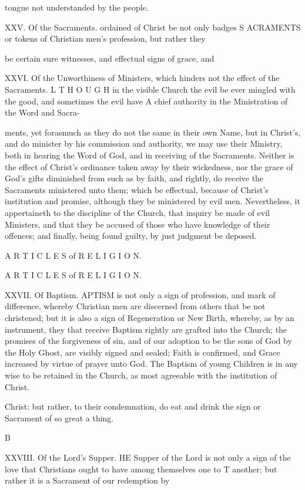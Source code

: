 tongue not understanded by the people.

XXV. Of the Sacraments. ordained of Christ be not only badges S ACRAMENTS or tokens of Christian men’s profession, but rather they

be certain sure witnesses, and effectual signs of grace, and

XXVI. Of the Unworthiness of Ministers, which hinders not the effect of the Sacraments. L T H O U G H in the visible Church the evil be ever mingled with the good, and sometimes the evil have A chief authority in the Ministration of the Word and Sacra-

ments, yet forasmuch as they do not the same in their own Name, but in Christ’s, and do minister by his commission and authority, we may use their Ministry, both in hearing the Word of God, and in receiving of the Sacraments. Neither is the effect of Christ’s ordinance taken away by their wickedness, nor the grace of God’s gifts diminished from such as by faith, and rightly, do receive the Sacraments ministered unto them; which be effectual, because of Christ's institution and promise, although they be ministered by evil men. Nevertheless, it appertaineth to the discipline of the Church, that inquiry be made of evil Ministers, and that they be accused of those who have knowledge of their offences; and finally, being found guilty, by just judgment be deposed.

A R T I C L E S of R E L I G I O N.

A R T I C L E S of R E L I G I O N.

XXVII. Of Baptism. APTISM is not only a sign of profession, and mark of difference, whereby Christian men are discerned from others that be not christened; but it is also a sign of Regeneration or New Birth, whereby, as by an instrument, they that receive Baptism rightly are grafted into the Church; the promises of the forgiveness of sin, and of our adoption to be the sons of God by the Holy Ghost, are visibly signed and sealed; Faith is confirmed, and Grace increased by virtue of prayer unto God. The Baptism of young Children is in any wise to be retained in the Church, as most agreeable with the institution of Christ.

Christ: but rather, to their condemnation, do eat and drink the sign or Sacrament of so great a thing.

B

XXVIII. Of the Lord’s Supper. HE Supper of the Lord is not only a sign of the love that Christians ought to have among themselves one to T another; but rather it is a Sacrament of our redemption by

